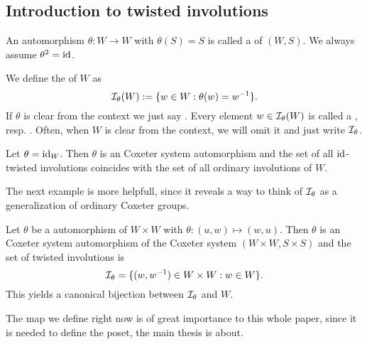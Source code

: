 \subsection{Introduction to twisted involutions}
\label{sec:twisted-involutions-introduction}

\begin{defi}
	An automorphism $\theta : W \to W$ with $\theta(S) = S$ is called a  of $(W,S)$. We always assume $\theta^2 = \operatorname{id}$.
\end{defi}

\begin{defi}
	We define the  of $W$ as
	$$ \mathcal{I}_{\theta}(W) := \{ w \in W : \theta(w) = w^{-1} \}. $$
	If $\theta$ is clear from the context we just say . Every element $w \in \mathcal{I}_{\theta}(W)$ is called a , resp. . Often, when $W$ is clear from the context, we will omit it and just write $\mathcal{I}_{\theta}$.
\end{defi}

\begin{exam}
	Let $\theta = \operatorname{id}_W$. Then $\theta$ is an Coxeter system automorphism and the set of all $\operatorname{id}$-twisted involutions coincides with the set of all ordinary involutions of $W$.
\end{exam}

The next example is more helpfull, since it reveals a way to think of $\mathcal{I}_{\theta}$ as a generalization of ordinary Coxeter groups.

\begin{exam}
	Let $\theta$ be a automorphism of $W \times W$ with $\theta : (u,w) \mapsto (w,u)$. Then $\theta$ is an Coxeter system automorphism of the Coxeter system $(W \times W, S \times S)$ and the set of twisted involutions is
	$$ \mathcal{I}_{\theta} = \{ (w,w^{-1}) \in W \times W : w \in W \}. $$
	This yields a canonical bijection between $\mathcal{I}_{\theta}$ and $W$.
\end{exam}

The map we define right now is of great importance to this whole paper, since it is needed to define the poset, the main thesis is about.

